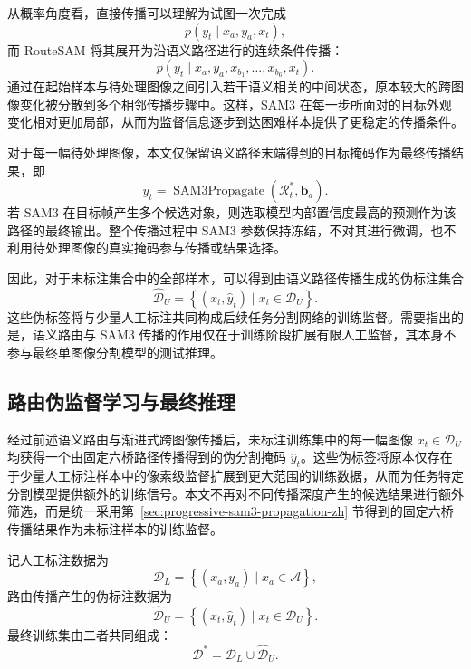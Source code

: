 \documentclass[UTF8,a4paper,10pt]{ctexart}
\begin{document}
从概率角度看，直接传播可以理解为试图一次完成
\begin{equation}
p\left(
y_t
\mid
x_a,y_a,x_t
\right),
\end{equation}
而 RouteSAM 将其展开为沿语义路径进行的连续条件传播：
\begin{equation}
p\left(
y_t
\mid
x_a,y_a,x_{b_1},\ldots,x_{b_6},x_t
\right).
\end{equation}
通过在起始样本与待处理图像之间引入若干语义相关的中间状态，原本较大的跨图像变化被分散到多个相邻传播步骤中。这样，SAM3 在每一步所面对的目标外观变化相对更加局部，从而为监督信息逐步到达困难样本提供了更稳定的传播条件。

对于每一幅待处理图像，本文仅保留语义路径末端得到的目标掩码作为最终传播结果，即
\begin{equation}
\widehat{y}_t
=
\operatorname{SAM3Propagate}
\left(
\mathcal{R}_t^{*},
\mathbf{b}_a
\right).
\end{equation}
若 SAM3 在目标帧产生多个候选对象，则选取模型内部置信度最高的预测作为该路径的最终输出。整个传播过程中 SAM3 参数保持冻结，不对其进行微调，也不利用待处理图像的真实掩码参与传播或结果选择。

因此，对于未标注集合中的全部样本，可以得到由语义路径传播生成的伪标注集合
\begin{equation}
\widehat{\mathcal{D}}_{U}
=
\left\{
\left(
x_t,\widehat{y}_t
\right)
\mid
x_t\in\mathcal{D}_{U}
\right\}.
\end{equation}
这些伪标签将与少量人工标注共同构成后续任务分割网络的训练监督。需要指出的是，语义路由与 SAM3 传播的作用仅在于训练阶段扩展有限人工监督，其本身不参与最终单图像分割模型的测试推理。






\subsection{路由伪监督学习与最终推理}
\label{sec:route-pseudo-supervision-zh}

经过前述语义路由与渐进式跨图像传播后，未标注训练集中的每一幅图像 $x_t\in\mathcal{D}_{U}$ 均获得一个由固定六桥路径传播得到的伪分割掩码 $\widehat{y}_t$。这些伪标签将原本仅存在于少量人工标注样本中的像素级监督扩展到更大范围的训练数据，从而为任务特定分割模型提供额外的训练信号。本文不再对不同传播深度产生的候选结果进行额外筛选，而是统一采用第~\ref{sec:progressive-sam3-propagation-zh} 节得到的固定六桥传播结果作为未标注样本的训练监督。

记人工标注数据为
\begin{equation}
\mathcal{D}_{L}
=
\left\{
(x_a,y_a)
\mid
x_a\in\mathcal{A}
\right\},
\end{equation}
路由传播产生的伪标注数据为
\begin{equation}
\widehat{\mathcal{D}}_{U}
=
\left\{
(x_t,\widehat{y}_t)
\mid
x_t\in\mathcal{D}_{U}
\right\}.
\end{equation}
最终训练集由二者共同组成：
\begin{equation}
\mathcal{D}^{*}
=
\mathcal{D}_{L}
\cup
\widehat{\mathcal{D}}_{U}.
\end{equation}
\end{document}
